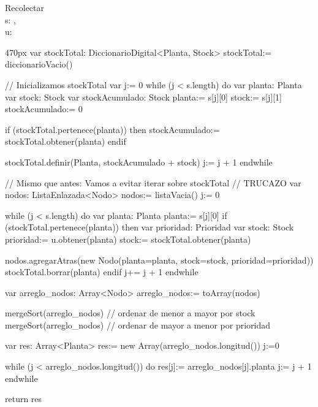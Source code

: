 \documentclass[10pt,a4paper]{article}
\begin{document}


\begin{proc}{Recolectar}{
  \\\Indent\In s: ,
  \\\Indent\In u: 
\\}{}
  \begin{ImplementationCode}{470px}
      var stockTotal: DiccionarioDigital<Planta, Stock>
          stockTotal:= diccionarioVacio()
    
      // Inicializamos stockTotal
      var j:= 0
      while (j < s.length) do
        var planta: Planta
        var stock: Stock
        var stockAcumulado: Stock
            planta:= s[j][0]
            stock:= s[j][1]
            stockAcumulado:= 0
    
        if (stockTotal.pertenece(planta)) then
            stockAcumulado:= stockTotal.obtener(planta)
        endif
    
        stockTotal.definir(Planta, stockAcumulado + stock)
        j:= j + 1
      endwhile
    
      // Mismo que antes: Vamos a evitar iterar sobre stockTotal
      // TRUCAZO
      var nodos: ListaEnlazada<Nodo>
          nodos:= listaVacia()
          j:= 0
    
      while (j < s.length) do
        var planta: Planta
            planta:= s[j][0]
        if (stockTotal.pertenece(planta)) then
          var prioridad: Prioridad
          var stock: Stock
              prioridad:= u.obtener(planta)
              stock:= stockTotal.obtener(planta)
    
          nodos.agregarAtras(new Nodo(planta=planta, stock=stock, prioridad=prioridad))
          stockTotal.borrar(planta)
        endif
        j+= j + 1
      endwhile
    
      var arreglo_nodos: Array<Nodo>
          arreglo_nodos:= toArray(nodos)
      
      mergeSort(arreglo_nodos) // ordenar de menor a mayor por stock
      mergeSort(arreglo_nodos) // ordenar de mayor a menor por prioridad
    
    
      var res: Array<Planta>
          res:= new Array(arreglo_nodos.longitud())
          j:=0
    
      while (j < arreglo_nodos.longitud()) do
        res[j]:= arreglo_nodos[j].planta
        j:= j + 1
      endwhile
    
      return res
  \end{ImplementationCode}
\end{proc}
\end{document}
